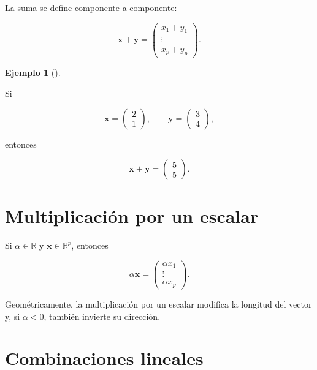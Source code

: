 \documentclass[
  spanish,
  10.5pt,
  letterpaper,
  DIV=11,
  numbers=noendperiod,
  oneside,
  open=any]{scrreprt}
\theoremstyle{definition}
\theoremstyle{definition}
\newtheorem{example}{Ejemplo}[chapter]
\theoremstyle{plain}
\theoremstyle{remark}
\begin{document}
La suma se define componente a componente:

\[
\mathbf{x}+\mathbf{y}
=
\begin{pmatrix}
x_1+y_1\\
\vdots\\
x_p+y_p
\end{pmatrix}.
\]

\begin{example}[]\protect\hypertarget{exm-suma-vectores}{}\label{exm-suma-vectores}

Si

\[
\mathbf{x}
=
\begin{pmatrix}
2\\
1
\end{pmatrix},
\qquad
\mathbf{y}
=
\begin{pmatrix}
3\\
4
\end{pmatrix},
\]

entonces

\[
\mathbf{x}+\mathbf{y}
=
\begin{pmatrix}
5\\
5
\end{pmatrix}.
\]

\end{example}

\section*{Multiplicación por un
escalar}\label{multiplicaciuxf3n-por-un-escalar}


Si \(\alpha\in\mathbb{R}\) y \(\mathbf{x}\in\mathbb{R}^{p}\), entonces

\[
\alpha\mathbf{x}
=
\begin{pmatrix}
\alpha x_1\\
\vdots\\
\alpha x_p
\end{pmatrix}.
\]

Geométricamente, la multiplicación por un escalar modifica la longitud
del vector y, si \(\alpha<0\), también invierte su dirección.

\section*{Combinaciones lineales}\label{combinaciones-lineales}
\end{document}

